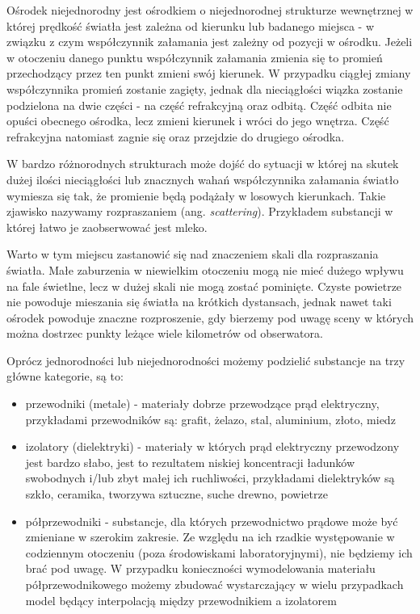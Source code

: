 \documentclass[../main.tex]{subfiles}
\begin{document}
Ośrodek niejednorodny jest ośrodkiem o niejednorodnej strukturze wewnętrznej w której prędkość światła jest zależna od kierunku lub badanego miejsca - w związku z czym współczynnik załamania jest zależny od pozycji w ośrodku. Jeżeli w otoczeniu danego punktu współczynnik załamania zmienia się to promień przechodzący przez ten punkt zmieni swój kierunek. W przypadku ciągłej zmiany współczynnika promień zostanie zagięty, jednak dla nieciągłości wiązka zostanie podzielona na dwie części - na część refrakcyjną oraz odbitą. Część odbita nie opuści obecnego ośrodka, lecz zmieni kierunek i wróci do jego wnętrza. Część refrakcyjna natomiast zagnie się oraz przejdzie do drugiego ośrodka. 

W bardzo różnorodnych strukturach może dojść do sytuacji w której na skutek dużej ilości nieciągłości lub znacznych wahań współczynnika załamania światło wymiesza się tak, że promienie będą podążały w losowych kierunkach. Takie zjawisko nazywamy rozpraszaniem (ang. \textit{scattering}). Przykładem substancji w której łatwo je zaobserwować jest mleko.

Warto w tym miejscu zastanowić się nad znaczeniem skali dla rozpraszania światła. Małe zaburzenia w niewielkim otoczeniu mogą nie mieć dużego wpływu na fale świetlne, lecz w dużej skali nie mogą zostać pominięte. Czyste powietrze nie powoduje mieszania się światła na krótkich dystansach, jednak nawet taki ośrodek powoduje znaczne rozproszenie, gdy bierzemy pod uwagę sceny w których można dostrzec punkty leżące wiele kilometrów od obserwatora. 

Oprócz jednorodności lub niejednorodności możemy podzielić substancje na trzy główne kategorie, są to:

\begin{itemize}
	\item przewodniki (metale) - materiały dobrze przewodzące prąd elektryczny, przykładami przewodników są: grafit, żelazo, stal, aluminium, złoto, miedz
    
	\item izolatory (dielektryki) - materiały w których prąd elektryczny przewodzony jest bardzo słabo, jest to rezultatem niskiej koncentracji ładunków swobodnych i/lub zbyt małej ich ruchliwości, przykładami dielektryków są szkło, ceramika, tworzywa sztuczne, suche drewno, powietrze
	
	\item półprzewodniki - substancje, dla których przewodnictwo prądowe może być zmieniane w szerokim zakresie. Ze względu na ich rzadkie występowanie w codziennym otoczeniu (poza środowiskami laboratoryjnymi), nie będziemy ich brać pod uwagę. W przypadku konieczności wymodelowania materiału półprzewodnikowego możemy zbudować wystarczający w wielu przypadkach model będący interpolacją między przewodnikiem a izolatorem
\end{itemize}
\end{document}
